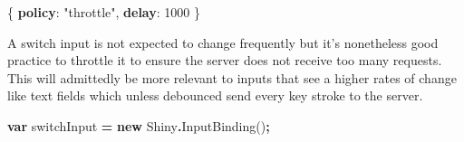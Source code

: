 \documentclass[
]{krantz}
\makeatletter
\newenvironment{Shaded}{\begin{snugshade}}{\end{snugshade}}
\newcommand{\DecValTok}[1]{\textcolor[rgb]{0.06,0.06,0.06}{#1}}
\newcommand{\ErrorTok}[1]{\textcolor[rgb]{0.14,0.14,0.14}{\textbf{#1}}}
\newcommand{\FunctionTok}[1]{\textcolor[rgb]{0,0,0}{#1}}
\newcommand{\KeywordTok}[1]{\textcolor[rgb]{0.27,0.27,0.27}{\textbf{#1}}}
\newcommand{\NormalTok}[1]{#1}
\newcommand{\OperatorTok}[1]{\textcolor[rgb]{0.43,0.43,0.43}{\textbf{#1}}}
\newcommand{\StringTok}[1]{\textcolor[rgb]{0.5,0.5,0.5}{#1}}
\newenvironment{kframe}{%
\medskip{}
\setlength{\fboxsep}{.8em}
 \def\at@end@of@kframe{}%
 \ifinner\ifhmode%
  \def\at@end@of@kframe{\end{minipage}}%
  \begin{minipage}{\columnwidth}%
 \fi\fi%
 \def\FrameCommand##1{\hskip\@totalleftmargin \hskip-\fboxsep
 \colorbox{shadecolor}{##1}\hskip-\fboxsep
     \hskip-\linewidth \hskip-\@totalleftmargin \hskip\columnwidth}%
 \MakeFramed {\advance\hsize-\width
   \@totalleftmargin\z@ \linewidth\hsize
   \@setminipage}}%
 {\par\unskip\endMakeFramed%
 \at@end@of@kframe}
\renewenvironment{Shaded}{\begin{kframe}}{\end{kframe}}
\makeatother
\begin{document}
\begin{Shaded}
\begin{Highlighting}[]
\FunctionTok{\{}
  \ErrorTok{policy}\FunctionTok{:} \StringTok{"throttle"}\FunctionTok{,}
  \ErrorTok{delay}\FunctionTok{:} \DecValTok{1000}
\FunctionTok{\}}
\end{Highlighting}
\end{Shaded}

A switch input is not expected to change frequently but it's nonetheless good practice to throttle it to ensure the server does not receive too many requests. This will admittedly be more relevant to inputs that see a higher rates of change like text fields which unless debounced send every key stroke to the server.

\begin{Shaded}
\begin{Highlighting}[]
\KeywordTok{var}\NormalTok{ switchInput }\OperatorTok{=} \KeywordTok{new}\NormalTok{ Shiny}\OperatorTok{.}\FunctionTok{InputBinding}\NormalTok{()}\OperatorTok{;}


\end{Highlighting}
\end{Shaded}
\end{document}
